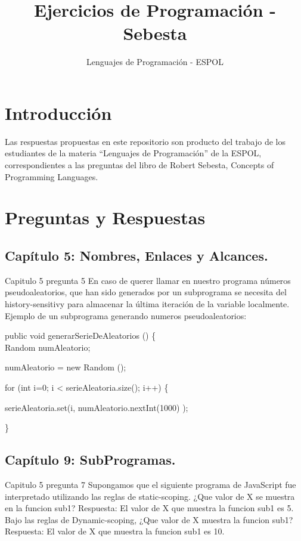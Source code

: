 \documentclass[12pt,oneside]{article}
\title{Ejercicios de Programación - Sebesta}
\author{Lenguajes de Programación - ESPOL}
\begin{document}
\maketitle

\section{Introducción}
Las respuestas propuestas en este repositorio son producto del trabajo de los estudiantes de la materia ``Lenguajes de Programación'' de la ESPOL, correspondientes a las preguntas del libro de Robert Sebesta, Concepts of Programming Languages.

\section{Preguntas y Respuestas}

\subsection{Capítulo 5: Nombres, Enlaces y Alcances.}

%
Capitulo 5 pregunta 5
En caso de querer llamar en nuestro programa números pseudoaleatorios, que han sido generados por un subprograma se necesita del history-sensitivy para almacenar la última iteración de la variable localmente. 
Ejemplo de un subprograma generando numeros pseudoaleatorios:

 public void generarSerieDeAleatorios () \{  \\

        Random numAleatorio;

        numAleatorio = new Random ();

        for (int i=0; i < serieAleatoria.size(); i++)  \{

        serieAleatoria.set(i, numAleatorio.nextInt(1000) );

         \}

\subsection{Capítulo 9: SubProgramas.}

%
%
Capitulo 5 pregunta 7
Supongamos que el siguiente programa de JavaScript fue interpretado utilizando las reglas de static-scoping.
¿Que valor de X se muestra en la funcion sub1? 
Respuesta: El valor de X que muestra la funcion sub1 es 5.
Bajo las reglas  de Dynamic-scoping, ¿Que valor de X muestra la funcion sub1?
Respuesta: El valor de X que muestra la funcion sub1 es 10.
\end{document}
